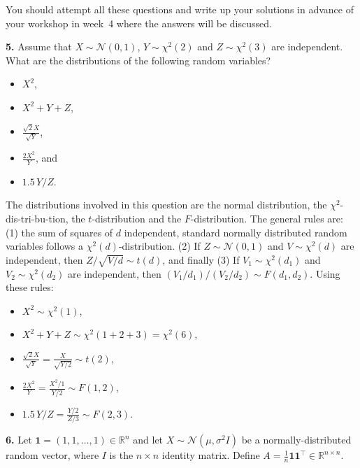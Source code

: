 \documentclass[
  a4paper,
]{article}
\theoremstyle{definition}
\theoremstyle{definition}
\theoremstyle{definition}
\theoremstyle{definition}
\theoremstyle{remark}
\begin{document}
You should attempt all these questions and write up your solutions in advance
of your workshop in week~4 where the answers will be discussed.

\textbf{5.} Assume that \(X \sim \mathcal{N}(0, 1)\), \(Y\sim \chi^2(2)\) and
\(Z \sim \chi^2(3)\) are independent. What are the distributions of
the following random variables?

\begin{itemize}
\item
  \(X^2\),
\item
  \(X^2 + Y + Z\),
\item
  \(\displaystyle\frac{\sqrt{2}X}{\sqrt{Y}}\),
\item
  \(\displaystyle\frac{2X^2}{Y}\), and
\item
  \(1.5\, Y/Z\).
\end{itemize}

\begin{myanswers}

The distributions involved in this question are the normal
distribution, the \(\chi^2\)-dis-tri-bu-tion, the \(t\)-distribution
and the \(F\)-distribution. The general rules are: (1) the sum of
squares of \(d\) independent, standard normally distributed random
variables follows a \(\chi^2(d)\)-distribution. (2) If
\(Z\sim\mathcal{N}(0,1)\) and \(V \sim \chi^2(d)\) are independent, then
\(Z / \sqrt{V / d} \sim t(d)\), and finally (3) If
\(V_1\sim \chi^2(d_1)\) and \(V_2\sim \chi^2(d_2)\) are independent,
then \((V_1/d_1)/(V_2/d_2) \sim F(d_1, d_2)\). Using these rules:

\begin{itemize}
\item
  \(X^2 \sim \chi^2(1)\),
\item
  \(X^2 + Y + Z \sim \chi^2(1+2+3) = \chi^2(6)\),
\item
  \(\displaystyle\frac{\sqrt{2}X}{\sqrt{Y}} = \frac{X}{\sqrt{Y/2}} \sim t(2)\),
\item
  \(\displaystyle\frac{2X^2}{Y} = \frac{X^2/1}{Y/2} \sim F(1,2)\),
\item
  \(\displaystyle 1.5\, Y/Z = \frac{Y/2}{Z/3} \sim F(2, 3)\).
\end{itemize}

\end{myanswers}

\textbf{6.} Let \(\mathbf{1} = (1, 1, \ldots, 1) \in\mathbb{R}^n\) and let \(X \sim \mathcal{N}(\mu, \sigma^2 I)\) be a normally-distributed random vector, where \(I\) is the
\(n\times n\) identity matrix. Define \(A = \frac1n \mathbf{1} \mathbf{1}^\top \in \mathbb{R}^{n\times n}\).
\end{document}

